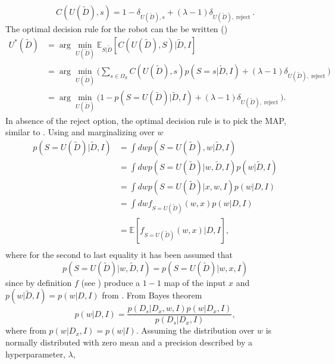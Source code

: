 \begin{equation}
	C(U(\tilde{D}),s) = 1- \delta_{U(\tilde{D}),s}+(\lambda-1)\delta_{U(\tilde{D}),\operatorname{reject}}.
\end{equation}
The optimal decision rule for the robot can the be written ()
\begin{equation}
	\begin{split}
		U^*(\tilde{D}) & = \arg\min_{U(\tilde{D})}\mathbb{E}_{S|\tilde{D}}[C(U(\tilde{D}), S)|\tilde{D},I]\\
		&= \arg\min_{U(\tilde{D})}\bigg(\sum_{s\in \Omega_S}C(U(\tilde{D}),s)p(S = s|\tilde{D},I)+(\lambda-1)\delta_{U(\tilde{D}),\operatorname{reject}}\bigg)\\
		& = \arg\min_{U(\tilde{D})}\bigg(1- p(S=U(\tilde{D})|\tilde{D},I)+(\lambda-1)\delta_{U(\tilde{D}),\operatorname{reject}}\bigg).
	\end{split}
	\label{eq:expected_cost1}
\end{equation}
In absence of the reject option, the optimal decision rule is to pick the MAP, similar to . Using  and marginalizing over $w$
\begin{equation}
	\begin{split}
		p(S= U(\tilde{D})|\tilde{D},I) &= \int dw p(S = U(\tilde{D}),w|\tilde{D},I) \\
		& = \int dw p(S = U(\tilde{D})|w,\tilde{D},I)  p(w|\tilde{D},I) \\
		& = \int dw p(S = U(\tilde{D})|x,w,I)  p(w|D,I) \\
		& = \int dw f_{S = U(\tilde{D})}(w,x)  p(w|D,I) \\
		& = \mathbb{E}[f_{S = U(\tilde{D})}(w,x)|D,I],\\
	\end{split}
	\label{eq:q5}
\end{equation}
where for the second to last equality it has been assumed that
\begin{equation}
	p(S = U(\tilde{D})|w,\tilde{D},I) = p(S = U(\tilde{D})|w,x,I)
\end{equation}
since by definition $f$ (see ) produce a $1-1$ map of the input $x$ and $p(w|\tilde{D},I) = p(w|D,I)$ from . From Bayes theorem
\begin{equation}
	p(w|D,I) =\frac{p(D_s|D_x,w,I)p(w|D_x,I)}{p(D_s|D_x,I)},
\end{equation}
where from  $p(w|D_x,I) = p(w|I)$. Assuming the distribution over $w$ is normally distributed with zero mean and a precision described by a hyperparameter, $\lambda$, 
